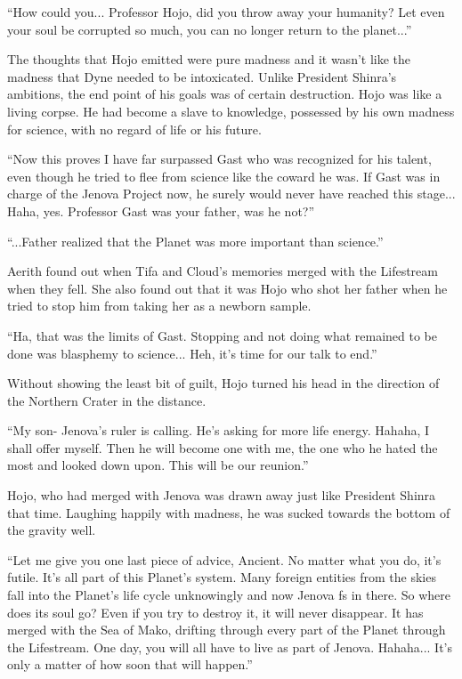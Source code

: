 \documentclass[oneside]{book}
\begin{document}
“How could you... Professor Hojo, did you throw away your humanity? Let even your soul be corrupted so much, you can no longer return to the planet...”

The thoughts that Hojo emitted were pure madness and it wasn't like the madness that Dyne needed to be intoxicated. Unlike President Shinra's ambitions, the end point of his goals was of certain destruction. Hojo was like a living corpse. He had become a slave to knowledge, possessed by his own madness for science, with no regard of life or his future.

“Now this proves I have far surpassed Gast who was recognized for his talent, even though he tried to flee from science like the coward he was. If Gast was in charge of the Jenova Project now, he surely would never have reached this stage... Haha, yes. Professor Gast was your father, was he not?”

“...Father realized that the Planet was more important than science.”

Aerith found out when Tifa and Cloud's memories merged with the Lifestream when they fell. She also found out that it was Hojo who shot her father when he tried to stop him from taking her as a newborn sample.

“Ha, that was the limits of Gast. Stopping and not doing what remained to be done was blasphemy to science... Heh, it's time for our talk to end.”

Without showing the least bit of guilt, Hojo turned his head in the direction of the Northern Crater in the distance.

“My son- Jenova's ruler is calling. He's asking for more life energy. Hahaha, I shall offer myself. Then he will become one with me, the one who he hated the most and looked down upon. This will be our reunion.”

Hojo, who had merged with Jenova was drawn away just like President Shinra that time. Laughing happily with madness, he was sucked towards the bottom of the gravity well.

“Let me give you one last piece of advice, Ancient. No matter what you do, it's futile. It's all part of this Planet's system. Many foreign entities from the skies fall into the Planet's life cycle unknowingly and now Jenova fs in there. So where does its soul go? Even if you try to destroy it, it will never disappear. It has merged with the Sea of Mako, drifting through every part of the Planet through the Lifestream. One day, you will all have to live as part of Jenova. Hahaha... It's only a matter of how soon that will happen.”
\end{document}
